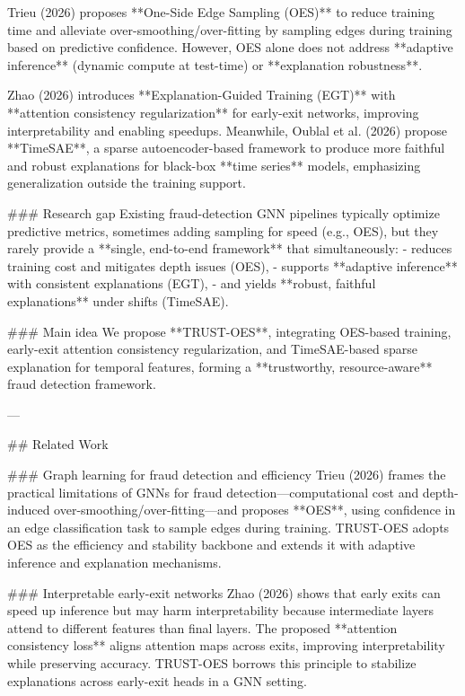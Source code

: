 Trieu (2026) proposes **One-Side Edge Sampling (OES)** to reduce training time and alleviate over-smoothing/over-fitting by sampling edges during training based on predictive confidence. However, OES alone does not address **adaptive inference** (dynamic compute at test-time) or **explanation robustness**.

Zhao (2026) introduces **Explanation-Guided Training (EGT)** with **attention consistency regularization** for early-exit networks, improving interpretability and enabling speedups. Meanwhile, Oublal et al. (2026) propose **TimeSAE**, a sparse autoencoder-based framework to produce more faithful and robust explanations for black-box **time series** models, emphasizing generalization outside the training support.

### Research gap  
Existing fraud-detection GNN pipelines typically optimize predictive metrics, sometimes adding sampling for speed (e.g., OES), but they rarely provide a **single, end-to-end framework** that simultaneously:
- reduces training cost and mitigates depth issues (OES),
- supports **adaptive inference** with consistent explanations (EGT),
- and yields **robust, faithful explanations** under shifts (TimeSAE).

### Main idea  
We propose **TRUST-OES**, integrating OES-based training, early-exit attention consistency regularization, and TimeSAE-based sparse explanation for temporal features, forming a **trustworthy, resource-aware** fraud detection framework.

---

## Related Work  

### Graph learning for fraud detection and efficiency  
Trieu (2026) frames the practical limitations of GNNs for fraud detection—computational cost and depth-induced over-smoothing/over-fitting—and proposes **OES**, using confidence in an edge classification task to sample edges during training. TRUST-OES adopts OES as the efficiency and stability backbone and extends it with adaptive inference and explanation mechanisms.

### Interpretable early-exit networks  
Zhao (2026) shows that early exits can speed up inference but may harm interpretability because intermediate layers attend to different features than final layers. The proposed **attention consistency loss** aligns attention maps across exits, improving interpretability while preserving accuracy. TRUST-OES borrows this principle to stabilize explanations across early-exit heads in a GNN setting.

